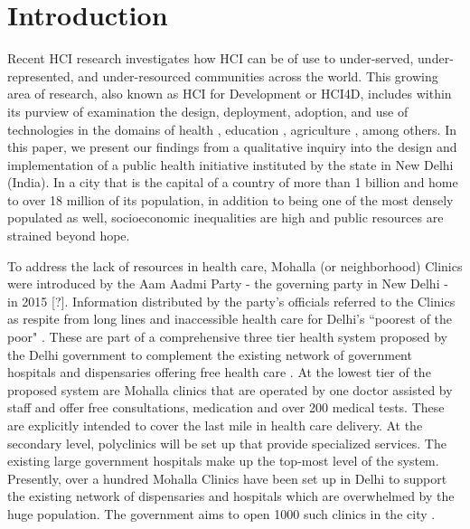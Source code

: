 \section{Introduction}
\begin{comment}
High level overview of the phenomenon you are studying. Should be something the reader can immediately get behind and hook themselves to. 
Now carry the reader through your flow. Draw their focus to the more narrow context in which you did your work.  
“In this paper, we focus on…” Give the high level description of your research.
“This paper is structured as follows.” Give the outline. When you mention the discussion, also mention the main findings of the discussion.
\end{comment}

Recent HCI research investigates how HCI can be of use to under-served, under-represented, and under-resourced communities across the world. This growing area of research, also known as HCI for Development or HCI4D, includes within its purview of examination the design, deployment, adoption, and use of technologies in the domains of health \cite{PH-CHI;TP}, education \cite{Kam}, agriculture \cite{Patel}, among others. In this paper, we present our findings from a qualitative inquiry into the design and implementation of a public health initiative instituted by the state in New Delhi (India). In a city that is the capital of a country of more than 1 billion and home to over 18 million of its population, in addition to being one of the most densely populated as well, socioeconomic inequalities are high and public resources are strained beyond hope. 

To address the lack of resources in health care, Mohalla (or neighborhood) Clinics were introduced by the Aam Aadmi Party - the governing party in New Delhi - in 2015 [?]. Information distributed by the party's officials referred to the Clinics as respite from long lines and inaccessible health care for Delhi's ``poorest of the poor"
\cite{AAPpressrelease}. These are part of a comprehensive three tier health system proposed by the Delhi government to complement the existing network of government hospitals and dispensaries offering free health care \cite{article}. At the lowest tier of the proposed system are Mohalla clinics that are operated by one doctor assisted by staff and offer free consultations, medication and over 200 medical tests. These are explicitly intended to cover the last mile in health care delivery. At the secondary level, polyclinics will be set up that provide specialized services. The existing large government hospitals make up the top-most level of the system. Presently, over a hundred Mohalla Clinics have been set up in Delhi to support the existing network of dispensaries and hospitals which are overwhelmed by the huge population. The government aims to open 1000 such clinics in the city \cite{?}.

